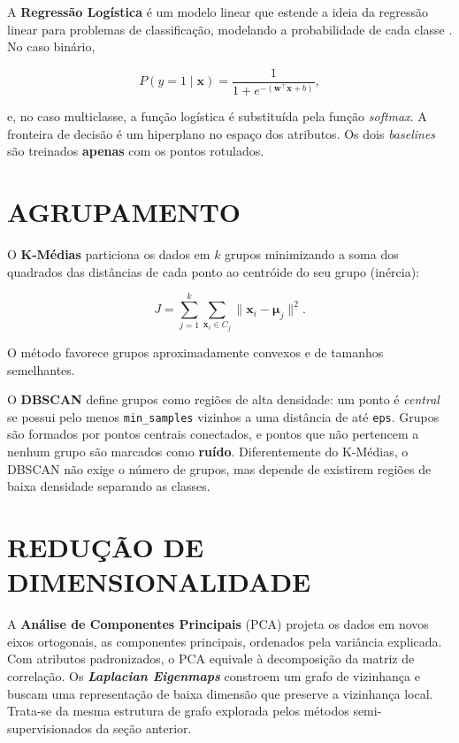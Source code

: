A \textbf{Regressão Logística} é um modelo linear que estende a ideia da regressão linear \citep{codifike_regressao} para problemas de classificação, modelando a probabilidade de cada classe \citep{admp_regressao_logistica}. No caso binário,

\begin{equation}
P(y = 1 \mid \mathbf{x}) = \frac{1}{1 + e^{-(\mathbf{w}^\top \mathbf{x} + b)}},
\label{eq:logistica}
\end{equation}

\noindent e, no caso multiclasse, a função logística é substituída pela função \textit{softmax}. A fronteira de decisão é um hiperplano no espaço dos atributos. Os dois \textit{baselines} são treinados \textbf{apenas} com os pontos rotulados.

\section{AGRUPAMENTO}

O \textbf{K-Médias} \citep{lloyd1982least} particiona os dados em $k$ grupos minimizando a soma dos quadrados das distâncias de cada ponto ao centróide do seu grupo (inércia):

\begin{equation}
J = \sum_{j=1}^{k} \sum_{\mathbf{x}_i \in C_j} \lVert \mathbf{x}_i - \boldsymbol{\mu}_j \rVert^2.
\label{eq:kmeans}
\end{equation}

\noindent O método favorece grupos aproximadamente convexos e de tamanhos semelhantes.

O \textbf{DBSCAN} \citep{ester1996density} define grupos como regiões de alta densidade: um ponto é \textit{central} se possui pelo menos \texttt{min\_samples} vizinhos a uma distância de até \texttt{eps}. Grupos são formados por pontos centrais conectados, e pontos que não pertencem a nenhum grupo são marcados como \textbf{ruído}. Diferentemente do K-Médias, o DBSCAN não exige o número de grupos, mas depende de existirem regiões de baixa densidade separando as classes.

\section{REDUÇÃO DE DIMENSIONALIDADE}

A \textbf{Análise de Componentes Principais} (PCA) \citep{jolliffe2002principal} projeta os dados em novos eixos ortogonais, as componentes principais, ordenados pela variância explicada. Com atributos padronizados, o PCA equivale à decomposição da matriz de correlação. Os \textbf{\textit{Laplacian Eigenmaps}} \citep{belkin2003laplacian} constroem um grafo de vizinhança e buscam uma representação de baixa dimensão que preserve a vizinhança local. Trata-se da mesma estrutura de grafo explorada pelos métodos semi-supervisionados da seção anterior.

